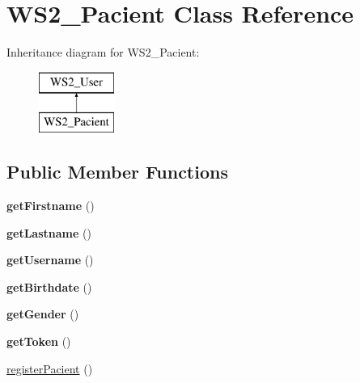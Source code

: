 \hypertarget{class_w_s2___pacient}{\section{W\+S2\+\_\+\+Pacient Class Reference}
\label{class_w_s2___pacient}
}
Inheritance diagram for W\+S2\+\_\+\+Pacient\+:\begin{figure}[H]
\begin{center}
\leavevmode
\includegraphics[height=2.000000cm]{class_w_s2___pacient}
\end{center}
\end{figure}
\subsection*{Public Member Functions}
\begin{DoxyCompactItemize}
\item 
\hypertarget{class_w_s2___pacient_a42c9621713b6dcdfb9edd5a7630b6d93}{{\bfseries get\+Firstname} ()}\label{class_w_s2___pacient_a42c9621713b6dcdfb9edd5a7630b6d93}

\item 
\hypertarget{class_w_s2___pacient_a5d606fdf02d35b79b74b91a88c09000f}{{\bfseries get\+Lastname} ()}\label{class_w_s2___pacient_a5d606fdf02d35b79b74b91a88c09000f}

\item 
\hypertarget{class_w_s2___pacient_a81b37a3c9d639574e394f80c1138c75e}{{\bfseries get\+Username} ()}\label{class_w_s2___pacient_a81b37a3c9d639574e394f80c1138c75e}

\item 
\hypertarget{class_w_s2___pacient_aeafdb95ad7b97a5ff68ac785e8c243e5}{{\bfseries get\+Birthdate} ()}\label{class_w_s2___pacient_aeafdb95ad7b97a5ff68ac785e8c243e5}

\item 
\hypertarget{class_w_s2___pacient_af7313369f22d5c761e16462abe0c6ae1}{{\bfseries get\+Gender} ()}\label{class_w_s2___pacient_af7313369f22d5c761e16462abe0c6ae1}

\item 
\hypertarget{class_w_s2___pacient_a211a2979c22afcd7d9056a2bb55aa449}{{\bfseries get\+Token} ()}\label{class_w_s2___pacient_a211a2979c22afcd7d9056a2bb55aa449}

\item 
\hyperlink{class_w_s2___pacient_a46300e082e774bfcef7b063ea442cf77}{register\+Pacient} ()
\end{DoxyCompactItemize}
